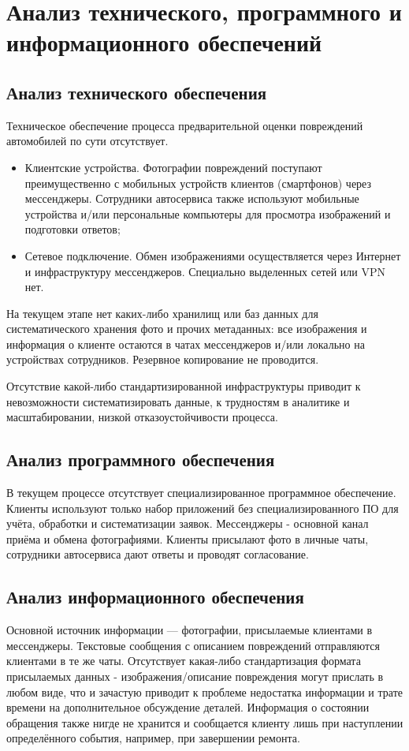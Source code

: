 \chapter{Анализ технического, программного и информационного обеспечений}\label{ch:3}

\section{Анализ технического обеспечения}\label{sec:3.1}

Техническое обеспечение процесса предварительной оценки повреждений автомобилей по сути отсутствует. 

\begin{itemize}
    \item Клиентские устройства. Фотографии повреждений поступают преимущественно с мобильных устройств клиентов (смартфонов) через мессенджеры. Сотрудники автосервиса также используют мобильные устройства и/или персональные компьютеры для просмотра изображений и подготовки ответов;
    \item Сетевое подключение. Обмен изображениями осуществляется через Интернет и инфраструктуру мессенджеров. Специально выделенных сетей или VPN нет.
\end{itemize}

На текущем этапе нет каких-либо хранилищ или баз данных для систематического хранения фото и прочих метаданных: все изображения и информация о клиенте остаются в чатах мессенджеров и/или локально на устройствах сотрудников.
Резервное копирование не проводится.

Отсутствие какой-либо стандартизированной инфраструктуры приводит к невозможности систематизировать данные, к трудностям в аналитике и масштабировании, низкой отказоустойчивости процесса.

\section{Анализ программного обеспечения}\label{sec:3.2}

В текущем процессе отсутствует специализированное программное обеспечение. Клиенты используют только набор приложений без специализированного ПО для учёта, обработки и систематизации заявок.
Мессенджеры - основной канал приёма и обмена фотографиями. Клиенты присылают фото в личные чаты, сотрудники автосервиса дают ответы и проводят согласование.

\section{Анализ информационного обеспечения}\label{sec:3.3}

Основной источник информации — фотографии, присылаемые клиентами в мессенджеры. Текстовые сообщения с описанием повреждений отправляются клиентами в те же чаты.
Отсутствует какая-либо стандартизация формата присылаемых данных - изображения/описание повреждения могут прислать в любом виде, что и зачастую приводит к проблеме недостатка информации и трате времени на дополнительное обсуждение деталей.
Информация о состоянии обращения также нигде не хранится и сообщается клиенту лишь при наступлении определённого события, например, при завершении ремонта. 
